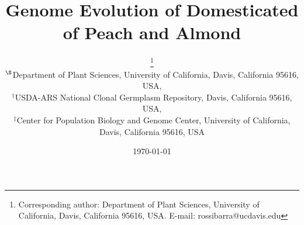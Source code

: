 \documentclass[12pt]{article}
\begin{document}
\title{Genome Evolution of Domesticated of Peach and Almond}

\author{\small{}\thanks{Corresponding author: Department of Plant Sciences, University of California, Davis, California 95616, USA. E-mail: \mbox{rossibarra@ucdavis.edu}} \\[0.3cm]
     \small\sf $^{\S}$Department of Plant Sciences, University of California, Davis, California 95616, USA,\\
     \small\sf $^{\dag}$USDA-ARS National Clonal Germplasm Repository, Davis, California 95616, USA,\\
     \small\sf $^{\ddag}$Center for Population Biology and Genome Center, University of California, Davis, California 95616, USA}

\date{\today}

\maketitle
\end{document}
